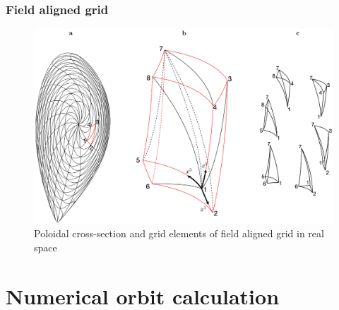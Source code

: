 \documentclass{beamer}
\begin{document}
\begin{frame}
\frametitle{Field aligned grid}
\vspace{-1cm}
		\begin{center}
			\begin{figure}
				\includegraphics[trim={0cm 2cm 0cm 0cm},clip,width=1\textwidth]{FIGURES/curvilinear_grid_02.eps}
				\caption{Poloidal cross-section and grid elements of field aligned grid in real space}
			\end{figure}
		\end{center}
\end{frame}





\section{Numerical orbit calculation}
\end{document}
